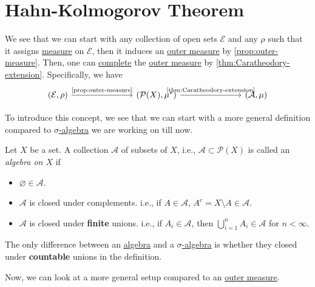 \section{Hahn-Kolmogorov Theorem}
We see that we can start with any collection of open sets \(\mathcal{E}\) and any \(\rho\) such that it assigns \hyperref[def:measure]{measure} on \(\mathcal{E}\), then it induces an \hyperref[def:outer-measure]{outer measure} by \autoref{prop:outer-measure}. Then, one can \hyperref[def:complete-measure-space]{complete} the \hyperref[def:outer-measure]{outer measure} by \autoref{thm:Caratheodory-extension}. Specifically, we have
\[
	\begin{tikzcd}
		(\mathcal{E}, \rho) \ar[rrr, "\text{\autoref{prop:outer-measure}}"] &&& (\mathcal{P}(X), \mu^{\ast} ) \ar[rrr, "\text{\autoref{thm:Caratheodory-extension}}"] &&& (\mathcal{A} , \mu)
	\end{tikzcd}
\]

To introduce this concept, we see that we can start with a more general definition compared to \hyperref[def:sigma-algebra]{\(\sigma\)-algebra} we are working on till now.

\begin{definition}[Algebra]\label{def:algebra}
	Let \(X\) be a set. A collection \(\mathcal{A} \) of subsets of \(X\), i.e., \(\mathcal{A}\subset \mathcal{P} (X) \) is called an \emph{algebra on \(X\)} if
	\begin{itemize}
		\item \(\varnothing \in \mathcal{A} \).
		\item \(\mathcal{A} \) is closed under complements. i.e., if \(A\in \mathcal{A} \), \(A^c = X\setminus A\in \mathcal{A} \).
		\item \(\mathcal{A} \) is closed under \textbf{finite} unions. i.e., if \(A_i\in \mathcal{A} \), then \(\bigcup_{i=1}^{n} A_{i}\in \mathcal{A} \) for \(n<\infty \).
	\end{itemize}
\end{definition}

\begin{remark}
	The only difference between an \hyperref[def:algebra]{algebra} and a \hyperref[def:sigma-algebra]{\(\sigma\)-algebra} is whether they closed under \textbf{countable} unions in the definition.
\end{remark}

Now, we can look at a more general setup compared to an \hyperref[def:outer-measure]{outer measure}.

